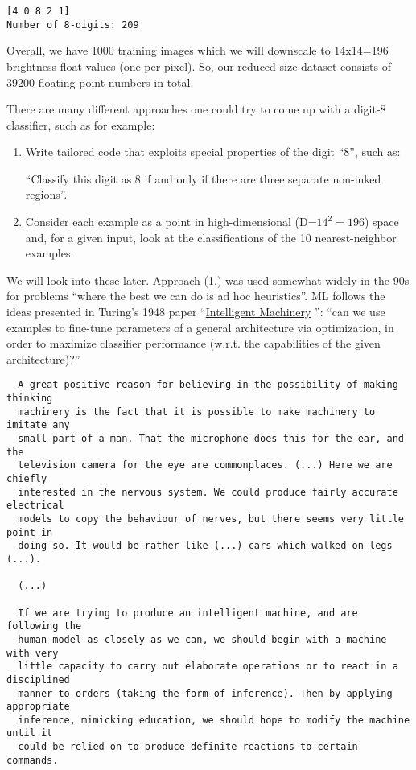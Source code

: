 \documentclass[11pt]{article}
\begin{document}
    \begin{Verbatim}[commandchars=\\\{\}]
[4 0 8 2 1]
Number of 8-digits: 209
    \end{Verbatim}

    Overall, we have 1000 training images which we will downscale to
14x14=196 brightness float-values (one per pixel). So, our reduced-size
dataset consists of 39200 floating point numbers in total.

There are many different approaches one could try to come up with a
digit-8 classifier, such as for example:

\begin{enumerate}
\def\labelenumi{\arabic{enumi}.}
\item
  Write tailored code that exploits special properties of the digit
  ``8'', such as:

  ``Classify this digit as 8 if and only if there are three separate
  non-inked regions''.
\item
  Consider each example as a point in high-dimensional (D=\(14^2=196\))
  space and, for a given input, look at the classifications of the 10
  nearest-neighbor examples.
\end{enumerate}

We will look into these later. Approach (1.) was used somewhat widely in
the 90s for problems ``where the best we can do is ad hoc heuristics''.
ML follows the ideas presented in Turing's 1948 paper
``\href{https://hashingit.com/elements/research-resources/1948-intelligent-machinery.pdf}{Intelligent
Machinery} \cite{turing2004intelligent}'': ``can we use examples to fine-tune parameters of a general
architecture via optimization, in order to maximize classifier
performance (w.r.t. the capabilities of the given architecture)?''

\begin{verbatim}
  A great positive reason for believing in the possibility of making thinking
  machinery is the fact that it is possible to make machinery to imitate any
  small part of a man. That the microphone does this for the ear, and the
  television camera for the eye are commonplaces. (...) Here we are chiefly
  interested in the nervous system. We could produce fairly accurate electrical
  models to copy the behaviour of nerves, but there seems very little point in
  doing so. It would be rather like (...) cars which walked on legs (...).

  (...)

  If we are trying to produce an intelligent machine, and are following the
  human model as closely as we can, we should begin with a machine with very
  little capacity to carry out elaborate operations or to react in a disciplined
  manner to orders (taking the form of inference). Then by applying appropriate
  inference, mimicking education, we should hope to modify the machine until it
  could be relied on to produce definite reactions to certain commands.
\end{verbatim}
\end{document}
